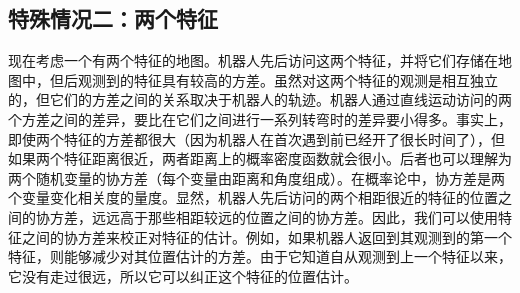 \subsection{特殊情况二：两个特征}

现在考虑一个有两个特征的地图。机器人先后访问这两个特征，并将它们存储在地图中，但后观测到的特征具有较高的方差。虽然对这两个特征的观测是相互独立的，但它们的方差之间的关系取决于机器人的轨迹。机器人通过直线运动访问的两个方差之间的差异，要比在它们之间进行一系列转弯时的差异要小得多。事实上，即使两个特征的方差都很大（因为机器人在首次遇到前已经开了很长时间了），但如果两个特征距离很近，两者距离上的概率密度函数就会很小。后者也可以理解为两个随机变量的协方差（每个变量由距离和角度组成）。在概率论中，协方差是两个变量变化相关度的量度。显然，机器人先后访问的两个相距很近的特征的位置之间的协方差，远远高于那些相距较远的位置之间的协方差。因此，我们可以使用特征之间的协方差来校正对特征的估计。例如，如果机器人返回到其观测到的第一个特征，则能够减少对其位置估计的方差。由于它知道自从观测到上一个特征以来，它没有走过很远，所以它可以纠正这个特征的位置估计。



